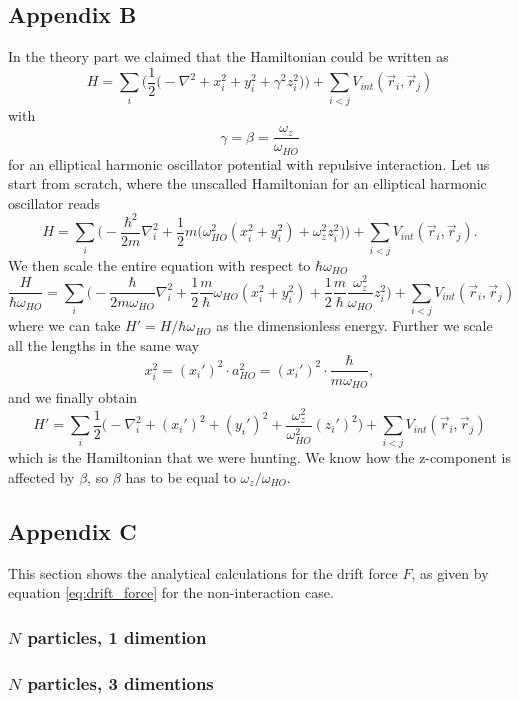 \documentclass[norsk,a4paper,12pt]{article}
\begin{document}
\subsection{Appendix B}
In the theory part we claimed that the Hamiltonian could be written as
\begin{equation}
H=\sum_i\bigg(\frac{1}{2}\Big(-\nabla^2 + x_i^2 + y_i^2 + \gamma^2z_i^2\Big)\bigg)+\sum_{i<j}V_{int}(\vec{r}_i,\vec{r}_j)
\end{equation}
with
\begin{equation*}
\gamma=\beta=\frac{\omega_z}{\omega_{HO}}
\end{equation*}
for an elliptical harmonic oscillator potential with repulsive interaction. Let us start from scratch, where the unscalled Hamiltonian for an elliptical harmonic oscillator reads
\begin{equation*}
H=\sum_i\bigg(-\frac{\hbar^2}{2m}\nabla_i^2+\frac{1}{2}m\Big(\omega_{HO}^2(x_i^2+y_i^2)+\omega_z^2z_i^2\Big)\bigg)+\sum_{i<j}V_{int}(\vec{r}_i, \vec{r}_j).
\end{equation*}
We then scale the entire equation with respect to $\hbar\omega_{HO}$
\begin{equation*}
\frac{H}{\hbar\omega_{HO}}=\sum_i\bigg(-\frac{\hbar}{2m\omega_{HO}}\nabla_i^2+\frac{1}{2}\frac{m}{\hbar}\omega_{HO}(x_i^2+y_i^2)+\frac{1}{2}\frac{m}{\hbar}\frac{\omega_z^2}{\omega_{HO}}z_i^2\bigg)+\sum_{i<j}V_{int}(\vec{r}_i, \vec{r}_j)
\end{equation*}
where we can take $H'=H/\hbar\omega_{HO}$ as the dimensionless energy. Further we scale all the lengths in the same way
\begin{equation*}
x_i^2=(x_i')^2\cdot a_{HO}^2=(x_i')^2\cdot\frac{\hbar}{m\omega_{HO}},
\end{equation*}
and we finally obtain
\begin{equation}
H'=\sum_i\frac{1}{2}\bigg(-\nabla_i^2+(x_i')^2+(y_i')^2+\frac{\omega_z^2}{\omega_{HO}^2}(z_i')^2\bigg)+\sum_{i<j}V_{int}(\vec{r}_i, \vec{r}_j)
\end{equation}
which is the Hamiltonian that we were hunting. We know how the z-component is affected by $\beta$, so $\beta$ has to be equal to $\omega_z/\omega_{HO}$.

\subsection{Appendix C}

This section shows the analytical calculations for the drift force $F$, as given by equation \ref{eq:drift_force} for the non-interaction case.

\subsubsection{$N$ particles, 1 dimention}

\subsubsection{$N$ particles, 3 dimentions}
\end{document}
